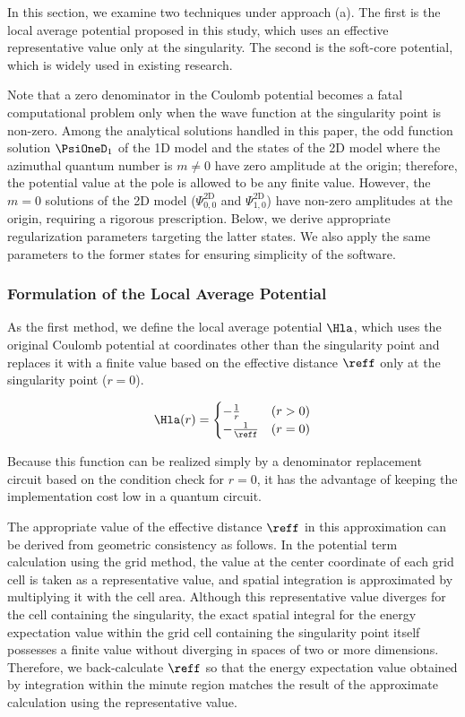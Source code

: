 \documentclass[manuscript_main.tex]{subfiles}
\begin{document}
In this section, we examine two techniques under approach (a). The first is the
local average potential proposed in this study, which uses an effective
representative value only at the singularity. The second is the soft-core
potential, which is widely used in existing research.

Note that a zero denominator in the Coulomb potential becomes a fatal
computational problem only when the wave function at the singularity point is
non-zero. Among the analytical solutions handled in this paper, the odd function
solution $\PsiOneD_1$ of the 1D model and the states of the 2D model where the
azimuthal quantum number is $m \neq 0$ have zero amplitude at the origin;
therefore, the potential value at the pole is allowed to be any finite value.
However, the $m=0$ solutions of the 2D model ($\Psi_{0,0}^{\mathrm{2D}}$ and
$\Psi_{1,0}^{\mathrm{2D}}$) have non-zero amplitudes at the origin, requiring a
rigorous prescription. Below, we derive appropriate regularization parameters
targeting the latter states.  We also apply the same parameters to the former
states for ensuring simplicity of the software.

\subsubsection{Formulation of the Local Average Potential}
\label{subsubsec:formulation-of-local-average-potential}

As the first method, we define the local average potential $\Hla$, which uses
the original Coulomb potential at coordinates other than the singularity point
and replaces it with a finite value based on the effective distance $\reff$ only
at the singularity point ($r=0$).

\begin{equation}
\Hla(r) = \begin{cases}
-\frac{1}{r} & (r>0) \\
-\frac{1}{\reff} & (r=0)
\end{cases}\label{eq:Halr}
\end{equation}

Because this function can be realized simply by a denominator replacement
circuit based on the condition check for $r=0$, it has the advantage of keeping
the implementation cost low in a quantum circuit.

The appropriate value of the effective distance $\reff$ in this approximation
can be derived from geometric consistency as follows. In the potential term
calculation using the grid method, the value at the center coordinate of each
grid cell is taken as a representative value, and spatial integration is
approximated by multiplying it with the cell area. Although this representative
value diverges for the cell containing the singularity, the exact spatial
integral for the energy expectation value within the grid cell containing the
singularity point itself possesses a finite value without diverging in spaces of
two or more dimensions. Therefore, we back-calculate $\reff$ so that the energy
expectation value obtained by integration within the minute region matches the
result of the approximate calculation using the representative value.
\end{document}
